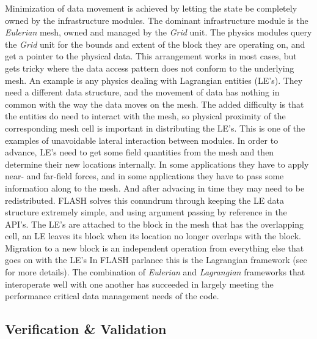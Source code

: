 Minimization of data movement is achieved by letting the state be
completely owned by the infrastructure modules. The dominant
infrastructure module is the {\em Eulerian} mesh, owned and managed by
the {\em Grid} unit. The physics modules query the {\em Grid} unit
for the bounds and extent of the block they are operating on, and
get a pointer to the physical data. This arrangement works in most
cases, but gets tricky where  the data access pattern does not conform
to the underlying mesh. An example is any physics dealing with
Lagrangian entities (LE's). They need a different data structure, and
the movement of data has nothing in common with the way the data moves
on the mesh. The added difficulty is that the entities do need to
interact with the mesh, so physical proximity of the corresponding
mesh cell is important in distributing the LE's. This is one of the
examples of unavoidable lateral interaction between modules. In order
to advance, LE's need to get some field quantities from the mesh and
then determine their new locations internally. In some applications
they have to apply near- and far-field forces, and in some
applications they have to pass some information along to the mesh. And
after advacing in time they may need to be redistributed. FLASH solves
this conundrum through keeping the LE data structure extremely simple,
and using argument passing by reference in the API's. The LE's are
attached to the block in the mesh that has the overlapping cell, an LE
leaves its block when its location no longer overlaps with the
block. Migration to a new block is an independent operation from
everything else that goes on with the LE's In FLASH parlance this is
the Lagrangian framework (see \cite{Dubey2012} for more details). The
combination of {\em Eulerian} and {\em Lagrangian} frameworks that
interoperate well with one another has succeeded in largely meeting the
performance critical data management needs of the code. 

\subsection{Verification \& Validation}
\label{sec:FLASHvandv}

